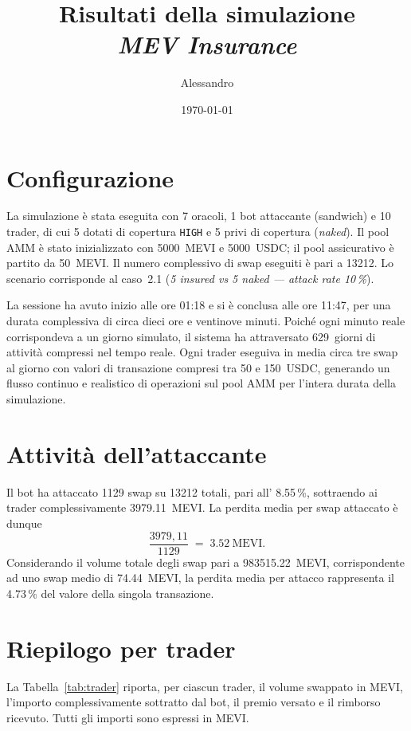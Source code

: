 \documentclass[a4paper,11pt]{article}
\title{Risultati della simulazione\\ \textit{MEV Insurance}}
\author{Alessandro}
\date{\today}
\begin{document}
\maketitle

\section{Configurazione}
La simulazione è stata eseguita con 7 oracoli, 1 bot attaccante (sandwich) e
10 trader, di cui 5 dotati di copertura \texttt{HIGH} e 5 privi di copertura
(\textit{naked}). Il pool AMM è stato inizializzato con \num{5000}~MEVI e
\num{5000}~USDC; il pool assicurativo è partito da \num{50}~MEVI. Il numero
complessivo di swap eseguiti è pari a \num{13212}. Lo scenario corrisponde al
caso~2.1 (\textit{5 insured vs 5 naked --- attack rate 10\,\%}).

La sessione ha avuto inizio alle ore 01:18 e si è conclusa alle ore 11:47, per
una durata complessiva di circa dieci ore e ventinove minuti. Poiché ogni minuto
reale corrispondeva a un giorno simulato, il sistema ha attraversato
\num{629}~giorni di attività compressi nel tempo reale. Ogni trader eseguiva in
media circa tre swap al giorno con valori di transazione compresi tra \num{50}
e \num{150}~USDC, generando un flusso continuo e realistico di operazioni sul
pool AMM per l'intera durata della simulazione.

\section{Attività dell'attaccante}
Il bot ha attaccato \num{1129} swap su \num{13212} totali, pari all'
\num{8,55}\,\%, sottraendo ai trader complessivamente \num{3979,11}~MEVI.
La perdita media per swap attaccato è dunque
\[
  \frac{3979{,}11}{1129} \;=\; \num{3,52}\ \text{MEVI}.
\]
Considerando il volume totale degli swap pari a \num{983515,22}~MEVI,
corrispondente ad uno swap medio di \num{74,44}~MEVI, la perdita media per
attacco rappresenta il \num{4,73}\,\% del valore della singola transazione.

\section{Riepilogo per trader}
La Tabella~\ref{tab:trader} riporta, per ciascun trader, il volume
swappato in MEVI, l'importo complessivamente sottratto dal bot, il premio
versato e il rimborso ricevuto. Tutti gli importi sono espressi in MEVI.
\end{document}

